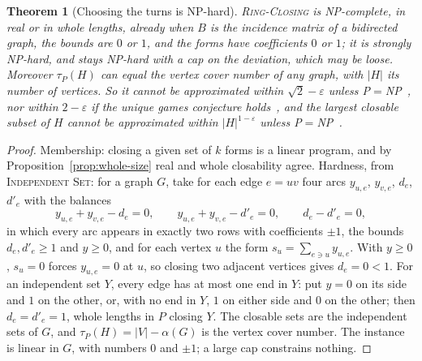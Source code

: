 \documentclass[11pt,a4paper]{article}
\newtheorem{theorem}{Theorem}
\newcommand{\shift}{s}
\newcommand{\RC}{\textup{\textsc{Ring-Closing}}}
\newcommand{\lean}[1]{\texttt{\detokenize{#1}}}
\newenvironment{evidence}[3][]{}{}
\begin{document}
\begin{evidence}{core}{the reduction: \lean{closable_iff_independent}, \lean{tauP_eq_vertex_cover}, $B$ bidirected: \lean{Gadget.balance_isBidirected}, \lean{Gadget.feasible_iff}; NP-hardness of Independent Set and Vertex Cover, and the bounds on approximation, are cited}
\begin{theorem}[Choosing the turns is NP-hard]\label{thm:nphard}
\RC{} is NP-complete, in real or in whole lengths, already when $B$ is the
incidence matrix of a bidirected graph, the bounds are $0$ or $1$, and the
forms have coefficients $0$ or $1$; it is strongly NP-hard, and stays NP-hard
with a cap on the deviation, which may be loose. Moreover $\tau_P(H)$ can
equal the vertex cover number of any graph, with $|H|$ its number of vertices.
So it cannot be approximated within $\sqrt2 - \varepsilon$ unless
P${}={}$NP~\cite{khot2017independent,dinur2018towards,dinur2018nonoptimally,khot2018grassmann},
nor within $2 - \varepsilon$ if the unique games conjecture
holds~\cite{khot2008vertex}, and the largest closable subset of $H$ cannot be
approximated within $|H|^{1-\varepsilon}$ unless
P${}={}$NP~\cite{hastad1999clique,zuckerman2007linear}.
\end{theorem}
\end{evidence}

\begin{proof}
Membership: closing a given set of $k$ forms is a linear program, and by
Proposition~\ref{prop:whole-size} real and whole closability agree. Hardness,
from \textup{\textsc{Independent Set}}: for a graph $G$, take for each edge $e
= uv$ four arcs $y_{u,e}$, $y_{v,e}$, $d_e$, $d'_e$ with the balances
\[
  y_{u,e} + y_{v,e} - d_e = 0, \qquad y_{u,e} + y_{v,e} - d'_e = 0, \qquad
  d_e - d'_e = 0 ,
\]
in which every arc appears in exactly two rows with coefficients $\pm1$, the
bounds $d_e, d'_e \ge 1$ and $y \ge 0$, and for each vertex $u$ the form
$\shift_u = \sum_{e \ni u} y_{u,e}$. With $y \ge 0$, $\shift_u = 0$ forces
$y_{u,e} = 0$ at $u$, so closing two adjacent vertices gives $d_e = 0 < 1$.
For an independent set $Y$, every edge has at most one end in $Y$: put $y = 0$
on its side and $1$ on the other, or, with no end in $Y$, $1$ on either side
and $0$ on the other; then $d_e = d'_e = 1$, whole lengths in $P$ closing $Y$.
The closable sets are the independent sets of $G$, and $\tau_P(H) = |V| -
\alpha(G)$ is the vertex cover number. The instance is linear in $G$, with
numbers $0$ and $\pm1$; a large cap constrains nothing.
\end{proof}
\end{document}

